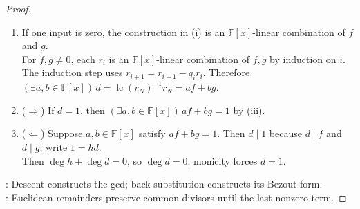 \begin{theorem}
\begin{proof}
\begin{enumerate}[label=(\roman*)]
Choose $h,k\in\mathbb{F}[x]$ with $e=hd$ and $d=ke$. Since $d,e\neq0$, $\deg e=\deg h+\deg d$ and $\deg d=\deg k+\deg e$.\\
Thus $\deg h=\deg k=0$ and $\deg d=\deg e$. Since $d,e$ are monic, $\operatorname{lc}(h)=1$, so $h=1$ and $e=d$.
\item[$(iii)$] If one input is zero, the construction in (i) is an $\mathbb{F}[x]$-linear combination of $f$ and $g$.\\
For $f,g\neq0$, each $r_i$ is an $\mathbb{F}[x]$-linear combination of $f,g$ by induction on $i$.\\
The induction step uses $r_{i+1}=r_{i-1}-q_ir_i$. Therefore $(\exists a,b\in\mathbb{F}[x])\,d=\operatorname{lc}(r_N)^{-1}r_N=af+bg$.
\item[$(iv)$] ($\Rightarrow$) If $d=1$, then $(\exists a,b\in\mathbb{F}[x])\,af+bg=1$ by (iii).
\item[$(iv)$] ($\Leftarrow$) Suppose $a,b\in\mathbb{F}[x]$ satisfy $af+bg=1$. Then $d\mid1$ because $d\mid f$ and $d\mid g$; write $1=hd$.\\
Then $\deg h+\deg d=0$, so $\deg d=0$; monicity forces $d=1$.
\end{enumerate}
: Descent constructs the gcd; back-substitution constructs its Bezout form.\\
: Euclidean remainders preserve common divisors until the last nonzero term.
\end{proof}
\end{theorem}
